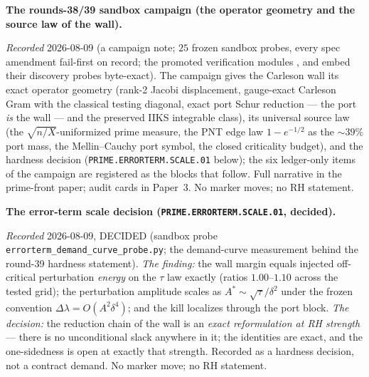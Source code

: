 \par\smallskip\noindent\textbf{The rounds-38/39 sandbox campaign
(the operator geometry and the source law of the wall).}
{\sloppy
\emph{Recorded} 2026-08-09 (a campaign note; $25$ frozen sandbox
probes, every spec amendment fail-first on record; the promoted
verification modules
,
 and
 embed their discovery probes
byte-exact).  The campaign gives the Carleson wall its exact
operator geometry (rank-2 Jacobi displacement, gauge-exact
Carleson Gram with the classical testing diagonal, exact port
Schur reduction --- the port \emph{is} the wall --- and the
preserved IIKS integrable class), its universal source law (the
$\sqrt{n/X}$-uniformized prime measure, the PNT edge law $1 -
e^{-1/2}$ as the ${\sim}39\%$ port mass, the Mellin--Cauchy port
symbol, the closed criticality budget), and the hardness decision
(\texttt{PRIME.ERRORTERM.SCALE.01} below); the six ledger-only
items of the campaign are registered as the blocks that follow.
Full narrative in the prime-front paper; audit cards in Paper~3.
No marker moves; no RH statement.\par}


\par\smallskip\noindent\textbf{The error-term scale decision
(\texttt{PRIME.ERRORTERM.\allowbreak SCALE.01}, decided).}
{\sloppy
\emph{Recorded} 2026-08-09, DECIDED (sandbox probe
\texttt{errorterm\_demand\_curve\_probe.py}; the demand-curve
measurement behind the round-39 hardness statement).  \emph{The
finding:} the wall margin equals injected off-critical
perturbation \emph{energy} on the $\tau$ law exactly (ratios
$1.00$--$1.10$ across the tested grid); the perturbation
amplitude scales as $A^{*} \sim \sqrt{\tau}/\delta^{2}$ under the
frozen convention $\Delta\lambda = O(A^{2}\delta^{4})$; and the
kill localizes through the port block.  \emph{The decision:} the
reduction chain of the wall is an \emph{exact reformulation at RH
strength} --- there is no unconditional slack anywhere in it; the
identities are exact, and the one-sidedness is open at exactly
that strength.  Recorded as a hardness decision, not a contract
demand.  No marker move; no RH statement.\par}


